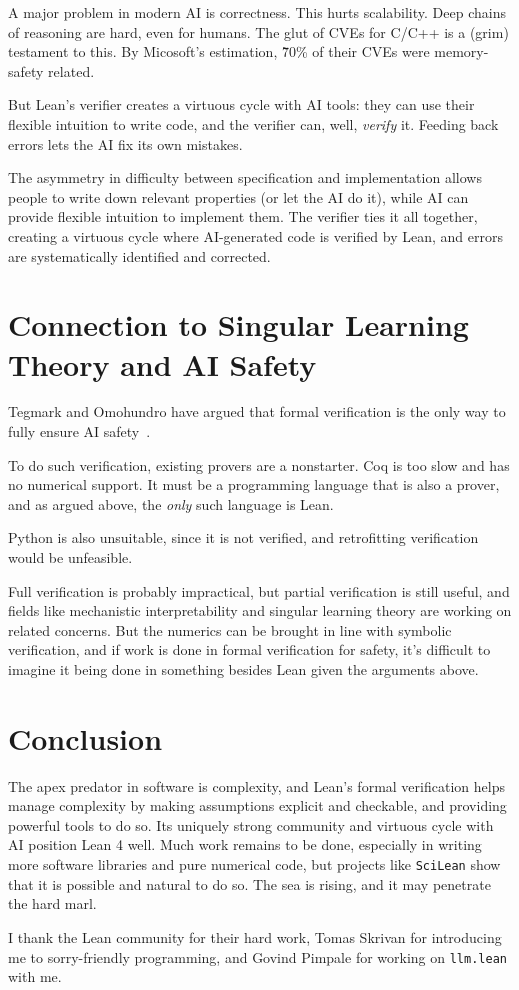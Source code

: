 \documentclass{article}
\begin{document}
A major problem in modern AI is correctness. This hurts scalability. Deep chains of reasoning are hard, even for humans. The glut of CVEs for C/C++ is a (grim) testament to this. By Micosoft's estimation, \~ 70\% of their CVEs were memory-safety related.\cite{microsoft-cves}

But Lean's verifier creates a virtuous cycle with AI tools: they can use their flexible intuition to write code, and the verifier can, well, \textit{verify} it. Feeding back errors lets the AI fix its own mistakes.

The asymmetry in difficulty between specification and implementation allows people to write down relevant properties (or let the AI do it), while AI can provide flexible intuition to implement them. The verifier ties it all together, creating a virtuous cycle where AI-generated code is verified by Lean, and errors are systematically identified and corrected.

\section{Connection to Singular Learning Theory and AI Safety}

Tegmark and Omohundro have argued that formal verification is the only way to fully ensure AI safety~\cite{tegmark2024}.

To do such verification, existing provers are a nonstarter. Coq is too slow and has no numerical support. It must be a programming language that is also a prover, and as argued above, the \textit{only} such language is Lean.

Python is also unsuitable, since it is not verified, and retrofitting verification would be unfeasible.

Full verification is probably impractical, but partial verification is still useful, and fields like mechanistic interpretability and singular learning theory are working on related concerns. But the numerics can be brought in line with symbolic verification, and if work is done in formal verification for safety, it's difficult to imagine it being done in something besides Lean given the arguments above.

\section{Conclusion}

The apex predator in software is complexity, and Lean's formal verification helps manage complexity by making assumptions explicit and checkable, and providing powerful tools to do so. Its uniquely strong community and virtuous cycle with AI position Lean 4 well. Much work remains to be done, especially in writing more software libraries and pure numerical code, but projects like \texttt{SciLean} show that it is possible and natural to do so. The sea is rising, and it may penetrate the hard marl.


\begin{ack}
  I thank the Lean community for their hard work, Tomas Skrivan for introducing me to sorry-friendly programming, and Govind Pimpale for working on \texttt{llm.lean} with me.
\end{ack}

\medskip

% 
% 
\end{document}
